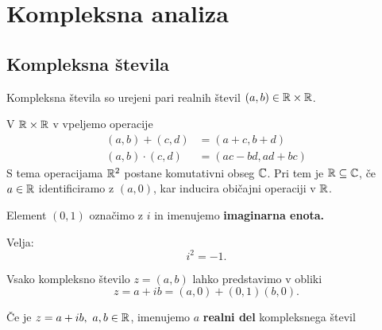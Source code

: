 \section{Kompleksna analiza}
\subsection{Kompleksna števila}
\begin{definicija}
    Kompleksna števila so urejeni pari realnih števil \((a,b) \in \mathbb{R} \times \mathbb{R}\).
\end{definicija}

V \(\mathbb{R} \times \mathbb{R}\) v vpeljemo operacije 
\begin{align*}
    (a, b) + (c, d) &= (a + c, b + d) \\
    (a, b) \cdot (c, d) &= (ac - bd, ad + bc)
\end{align*}
S tema operacijama \(\mathbb{R}^2\) postane komutativni obseg \(\mathbb{C}\). Pri tem je \(\mathbb{R} \subseteq \mathbb{C}\), če \(a \in \mathbb{R}\) identificiramo z \((a, 0)\), kar inducira običajni operaciji v \(\mathbb{R}\).

\begin{definicija}
    Element \((0,1)\) označimo z \(i\) in imenujemo \textbf{imaginarna enota.}
\end{definicija}

Velja: \[i^2 = -1.\]

Vsako kompleksno število \(z = (a, b)\) lahko predstavimo v obliki 
\[z = a + i b = (a, 0) + (0, 1)(b, 0).\]

Če je \(z = a +ib, \ a, b \in \mathbb{R}\), imenujemo \(a\) \textbf{realni del} kompleksnega števil